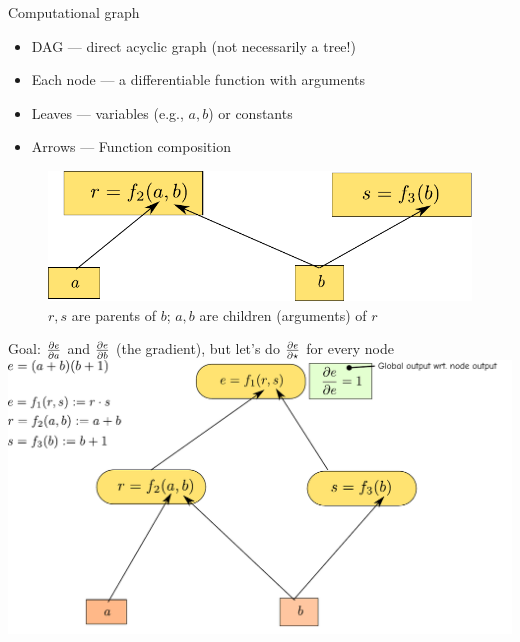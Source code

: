 \documentclass[12pt,aspectratio=169]{beamer}
\begin{document}
\begin{frame}{Computational graph}
\begin{itemize}
	\item DAG --- direct acyclic graph (not necessarily a tree!)
	\item Each node --- a differentiable function with arguments
	\item Leaves --- variables (e.g., $a, b$) or constants
	\item Arrows --- Function composition
\end{itemize}

\begin{figure}
	\includegraphics[width=0.75\linewidth]{img/parent-child.pdf}
	\caption{$r, s$ are parents of $b$; $a, b$ are children (arguments) of $r$}
\end{figure}

	

\end{frame}

\begin{frame}{Goal: $\pdv{e}{a}$ and $\pdv{e}{b}$ (the gradient), but let's do $\pdv{e}{\star}$ for every node}
	\includegraphics[width=1.2\linewidth]{img/backprop03.pdf}
\end{frame}
\end{document}

